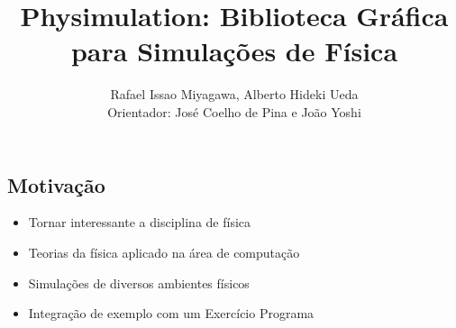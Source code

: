 \documentclass[plainboxedsections]{sciposter}
\title{Physimulation: Biblioteca Gráfica para Simulações de Física}
\author{Rafael Issao Miyagawa, Alberto Hideki Ueda\\ Orientador: José Coelho de Pina e João Yoshi}
\institute{Instituto de Matemática e Estatística - Universidade de São Paulo}
\begin{document}
\maketitle

\renewcommand{\papertype}{b1}
\renewcommand{\sectionsize}{\Huge}

\begin{multicols}{2}

  \section*{Motivação}
  \fontsize{50pt}{15pt}\selectfont
  \begin{itemize}
    \item Tornar interessante a disciplina de física
    \item Teorias da física aplicado na área de computação
    \item Simulações de diversos ambientes físicos
    \item Integração de exemplo com um Exercício Programa
  \end{itemize}


\end{multicols}
\end{document}
